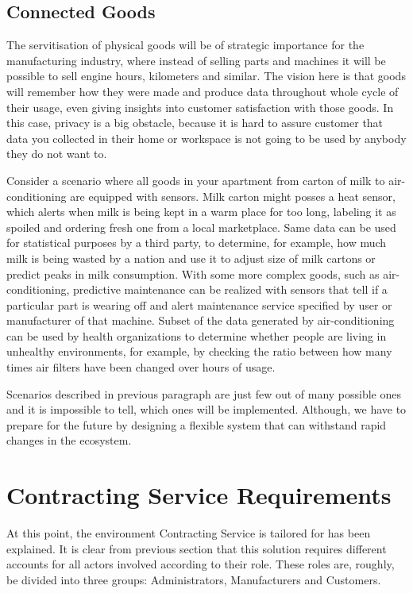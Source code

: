 \subsection{Connected Goods}

The  servitisation  of  physical  goods  will  be  of  strategic  importance  for the  manufacturing  industry, where instead of selling parts and machines it will be possible to sell engine hours, kilometers and similar. The vision here is that goods will remember how they were made and produce data throughout whole cycle of their usage, even giving insights into customer satisfaction with those goods. In this case, privacy is a big obstacle, because it is hard to assure customer that data you collected in their home or workspace is not going to be used by anybody they do not want to.

Consider a scenario where all goods in your apartment from carton of milk to air-conditioning are equipped with sensors. Milk carton might posses a heat sensor, which alerts when milk is being kept in a warm place for too long, labeling it as spoiled and ordering fresh one from a local marketplace. Same data can be used for statistical purposes by a third party, to determine, for example, how much milk is being wasted by a nation and use it to adjust size of milk cartons or predict peaks in milk consumption. With some more complex goods, such as air-conditioning, predictive maintenance can be realized with sensors that tell if a particular part is wearing off and alert maintenance service specified by user or manufacturer of that machine. Subset of the data generated by air-conditioning can be used by health organizations to determine whether people are living in unhealthy environments, for example, by checking the ratio between how many times air filters have been changed over hours of usage.

Scenarios described in previous paragraph are just few out of many possible ones and it is impossible to tell, which ones will be implemented. Although, we have to prepare for the future by designing a flexible system that can withstand rapid changes in the ecosystem.

\section{Contracting Service Requirements}

At this point, the environment Contracting Service is tailored for has been explained. It is clear from previous section that this solution requires different accounts for all actors involved according to their role. These roles are, roughly, be divided into three groups: Administrators, Manufacturers and Customers.

